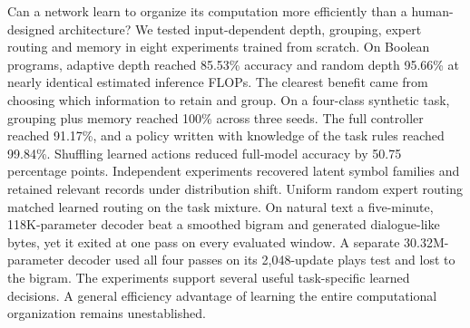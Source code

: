  Can a network learn to organize its computation more efficiently than a human-designed architecture? We tested input-dependent depth, grouping, expert routing and memory in eight experiments trained from scratch. On Boolean programs, adaptive depth reached 85.53\% accuracy and random depth 95.66\% at nearly identical estimated inference FLOPs. The clearest benefit came from choosing which information to retain and group. On a four-class synthetic task, grouping plus memory reached 100\% across three seeds. The full controller reached 91.17\%, and a policy written with knowledge of the task rules reached 99.84\%. Shuffling learned actions reduced full-model accuracy by 50.75 percentage points. Independent experiments recovered latent symbol families and retained relevant records under distribution shift. Uniform random expert routing matched learned routing on the task mixture. On natural text a five-minute, 118K-parameter decoder beat a smoothed bigram and generated dialogue-like bytes, yet it exited at one pass on every evaluated window. A separate 30.32M-parameter decoder used all four passes on its 2,048-update plays test and lost to the bigram. The experiments support several useful task-specific learned decisions. A general efficiency advantage of learning the entire computational organization remains unestablished.
